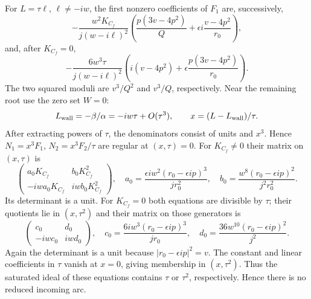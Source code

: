 \documentclass[11pt,a4paper]{article}
\numberwithin{equation}{section}
\theoremstyle{plain}
\theoremstyle{definition}
\theoremstyle{remark}
\begin{document}
For $L=\tau\ell$, $\ell\ne-iw$, the first nonzero coefficients of $F_1$
are, successively,
\[
 -\frac{w^2K_{C_f}}{j(w-i\ell)^2}
 \left(\frac{p(3v-4p^2)}Q+\epsilon i\frac{v-4p^2}{r_0}\right),
\]
and, after $K_{C_f}=0$,
\[
 -\frac{6w^3\tau}{j(w-i\ell)^2}
 \left(i(v-4p^2)+\epsilon\frac{p(3v-4p^2)}{r_0}\right).
\]
The two squared moduli are $v^3/Q^2$ and $v^3/Q$, respectively.
  Near the remaining root use the zero set $W=0$:
\[
 L_{\rm wall}=-\beta/\alpha=-iw\tau+O(\tau^3),\qquad
 x=(L-L_{\rm wall})/\tau.
\]
After extracting powers of $\tau$, the denominators consist of units and $x^3$.  Hence
$N_1=x^3F_1$, $N_2=x^3F_2/\tau$ are regular at $(x,\tau)=0$.
For $K_{C_f}\ne0$ their matrix on $(x,\tau)$ is
\[
 \begin{pmatrix}a_0K_{C_f}&b_0K_{C_f}^2\\-iwa_0K_{C_f}&iwb_0K_{C_f}^2\end{pmatrix},
\quad
 a_0=\frac{\epsilon iw^2(r_0-\epsilon ip)^3}{jr_0^2},\quad
 b_0=\frac{w^8(r_0-\epsilon ip)^2}{j^2r_0^2}.
\]
Its determinant is a unit. For $K_{C_f}=0$ both equations are divisible
by $\tau$; their quotients lie in $(x,\tau^2)$ and their matrix on those
generators is
\[
 \begin{pmatrix}c_0&d_0\\-iwc_0&iwd_0\end{pmatrix},\quad
 c_0=\frac{6iw^3(r_0-\epsilon ip)^3}{jr_0},\quad
 d_0=\frac{36w^{10}(r_0-\epsilon ip)^2}{j^2}.
\]
Again the determinant is a unit because $|r_0-\epsilon ip|^2=v$.
The constant and linear coefficients in $\tau$ vanish at $x=0$, giving membership in $(x,\tau^2)$.
Thus the saturated ideal of these equations contains $\tau$ or $\tau^2$, respectively.
Hence there is no reduced incoming arc.
\end{document}
